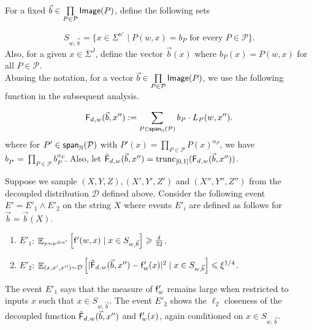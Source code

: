 \documentclass[10pt,a4paper]{amsart}
\newcommand\Expect[2]{{\mathop{\mathbb{E}}_{#1}\left[ {#2} \right]}}
\newcommand\spn{{\sf span}_{\mathbb{N}}}
\renewcommand\geq{\geqslant}
\renewcommand\leq{\leqslant}
\newcommand{\V}[1]{{#1}}
\begin{document}
  
For a fixed $\vec{b}\in\prod\limits_{P\in\mathcal{P}}{\sf Image}(P)$, define the following sets

$$S_{\V w, \vec{b}} = \{ x\in \Sigma^{n'} \mid P(\V w,\V x) = b_P \mbox{ for every } P\in \mathcal{P}\}.$$
%
Also, for a given $\V x\in \Sigma^{\bar{J}}$, define the vector $\vec{b}(\V x)$ where $b_P(\V x) = P(\V w, \V x)$ for all $P\in \mathcal{P}$.\\

Abusing the notation, for a vector $\vec{b}\in\prod\limits_{P\in\mathcal{P}}{\sf Image}(P)$, we use the following function in the subsequent analysis.

$$\fcoarsedecoupled_{, \V w}(\vec{b}, \V x'') := \sum\limits_{P\in\spn(\mathcal{P})} b_P \cdot L_P(\V w, \V x'').$$
%
where for $P'\in\spn(\mathcal{P})$ with $P'(x) = \prod\limits_{P\in\mathcal{P}}P(x)^{\alpha_{P}}$, we have $b_{P'} = \prod\limits_{P\in\mathcal{P}}b_P^{\alpha_{P}}$. Also, let $\truncfcoarsedecoupled_{,\V w}(\vec{b},\V x'') = \mathrm{trunc}_{[0,1]}(\fcoarsedecoupled_{,\V w}(\vec{b},\V x''))$.

Suppose we sample $(X, Y, Z), (X', Y', Z')$ and $(X'', Y'', Z'')$ from the decoupled distribution $\mathcal{D}$ defined above. Consider the following event $E' = E'_1\wedge E'_2$ on the string $X$ where events $E'_i$ are defined as follows for $\vec{b} = \vec{b}(X)$.

\begin{enumerate}
    \item\label{event:E'1} $E'_1$: $\Expect{\V x\sim \nu^{\otimes n'}}{\noisyfrefined(\V w, \V x) \mid \V x\in S_{\V w, \vec{b}}}\geq \frac{\delta}{32}$.
    \item\label{event:E'2} $E'_2$: $\Expect{(\V x, \V x', \V x'')\sim \mathcal{D}}{|\truncfcoarsedecoupled_{,\V w}(\vec{b},\V x'')  - \noisyfrefined_{\V w}(\V x)|^2 \mid \V x\in S_{\V w, \vec{b}}} \leq \xi^{1/4}$.
\end{enumerate}

The event $E'_1$ says that the measure of $\noisyfrefined_{\V w}$ remains large when restricted to inputs $x$ such that $x\in S_{\V w, \vec{b}}$. The event $E'_2$ shows the $\ell_2$ closeness of the decoupled function $\truncfcoarsedecoupled_{,\V w}(\vec{b},\V x'')$ and $\noisyfrefined_{\V w}(\V x)$, again conditioned on $x\in S_{\V w, \vec{b}}$.
\end{document}
